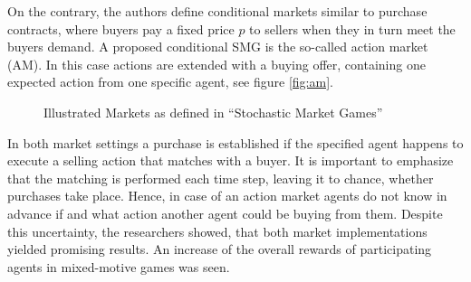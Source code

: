 On the contrary, the authors define conditional markets similar to purchase contracts, where buyers pay a fixed price $p$ to sellers when they in turn meet the buyers demand. A proposed conditional SMG is the so-called action market (AM). In this case actions are extended with a buying offer, containing one expected action from one specific agent, see figure \ref{fig:am}.


\begin{figure}[hpbt]
    \centering
    \hspace{0.01\textwidth}
    \caption[Illustrated Markets]{Illustrated Markets as defined in ``Stochastic Market Games'' \cite{scbe21}}
    \label{fig:multipic} %
\end{figure}

In both market settings a purchase is established if the specified agent happens to execute a selling action that matches with a buyer. It is important to emphasize that the matching is performed each time step, leaving it to chance, whether purchases take place. Hence, in case of an action market agents do not know in advance if and what action another agent could be buying from them. Despite this uncertainty, the researchers showed, that both market implementations yielded promising results. An increase of the overall rewards of participating agents in mixed-motive games was seen.